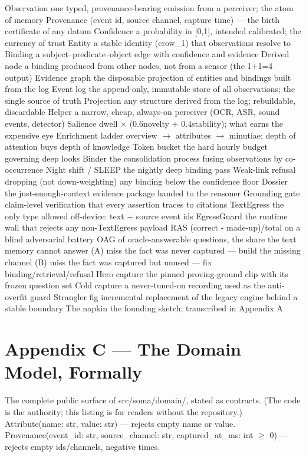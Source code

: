 Observation one typed, provenance-bearing emission from a perceiver; the atom of memory Provenance (event id, source channel, capture time) --- the birth certificate of any datum Confidence a probability in {[}0,1{]}, intended calibrated; the currency of trust Entity a stable identity (crow\_1) that observations resolve to Binding a subject--predicate--object edge with confidence and evidence Derived node a binding produced from other nodes, not from a sensor (the 1+1=4 output) Evidence graph the disposable projection of entities and bindings built from the log Event log the append-only, immutable store of all observations; the single source of truth Projection any structure derived from the log; rebuildable, discardable Helper a narrow, cheap, always-on perceiver (OCR, ASR, sound events, detector) Salience dwell \(\times\) (0.6\textperiodcentered{}novelty + 0.4\textperiodcentered{}stability); what earns the expensive eye Enrichment ladder overview \(\rightarrow\) attributes \(\rightarrow\) minutiae; depth of attention buys depth of knowledge Token bucket the hard hourly budget governing deep looks Binder the consolidation process fusing observations by co-occurrence Night shift / SLEEP the nightly deep binding pass Weak-link refusal dropping (not down-weighting) any binding below the confidence floor Dossier the just-enough-context evidence package handed to the reasoner Grounding gate claim-level verification that every assertion traces to citations TextEgress the only type allowed off-device: text + source event ids EgressGuard the runtime wall that rejects any non-TextEgress payload RAS (correct - made-up)/total on a blind adversarial battery OAG of oracle-answerable questions, the share the text memory cannot answer (A) miss the fact was never captured --- build the missing channel (B) miss the fact was captured but unused --- fix binding/retrieval/refusal Hero capture the pinned proving-ground clip with its frozen question set Cold capture a never-tuned-on recording used as the anti-overfit guard Strangler fig incremental replacement of the legacy engine behind a stable boundary The napkin the founding sketch; transcribed in Appendix A

\chapter*{Appendix C --- The Domain Model, Formally}\label{appendix-c-the-domain-model-formally}

The complete public surface of src/soma/domain/, stated as contracts. (The code is the authority; this listing is for readers without the repository.) Attribute(name: str, value: str) --- rejects empty name or value. Provenance(event\_id: str, source\_channel: str, captured\_at\_ms: int \(\geq\) 0) --- rejects empty ids/channels, negative times.

